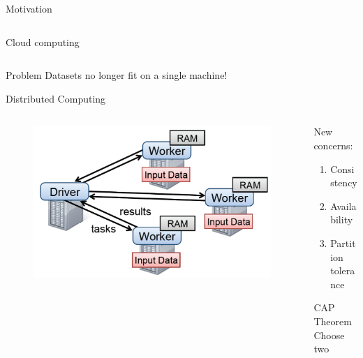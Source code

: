 \documentclass[pdf]{beamer}
\begin{document}
\begin{frame}[t]{Motivation}
\begin{columns}
\begin{column}{0.49\textwidth}
\begin{block}{Cloud computing}
\begin{figure}[htpb]
                \end{figure}
            \end{block}
        \end{column}
    \end{columns}

    \begin{block}{Problem}
        Datasets no longer fit on a single machine!
    \end{block}
\end{frame}

\begin{frame}[t]{Distributed Computing}
    \begin{columns}
        \begin{column}{0.7\textwidth}
            \begin{figure}[htpb]
                \centering
                \includegraphics[width=\linewidth]{Figures/distcomp.png}
            \end{figure}
        \end{column}
        \begin{column}{0.3\textwidth}
            New concerns:
            \begin{enumerate}
                \item Consistency
                \item Availability
                \item Partition tolerance
            \end{enumerate}
            \begin{block}{CAP Theorem \cite{gilbert2002brewer}}
                Choose two
            \end{block}
        \end{column}
    \end{columns}
\end{frame}
\end{document}
